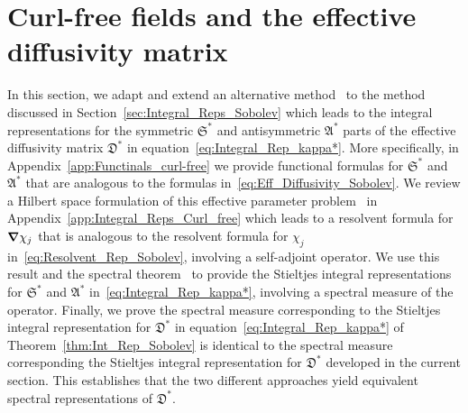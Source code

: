 \documentclass[english,12pt,jmp,graphicx]{revtex4-1}
\newcommand{\thmref}[1]{Theorem~\ref{#1}}
\newcommand{\secref}[1]{Section~\ref{#1}}
\newcommand{\appref}[1]{Appendix~\ref{#1}}
\newcommand{\bnabla}{\mbox{\boldmath${\nabla}$}}
\newcommand{\Sg}{\mathfrak{S}}
\newcommand{\Ag}{\mathfrak{A}}
\newcommand{\Dg}{\mathfrak{D}}
\begin{document}
\section{Curl-free fields and the effective diffusivity
  matrix} \label{app:Curl_Free}    
%
In this section, we adapt and extend an alternative
method~\cite{Avellaneda:PRL-753,Avellaneda:CMP-339} to the method
discussed in \secref{sec:Integral_Reps_Sobolev} which leads to the 
integral representations for the symmetric $\Sg^*$ and antisymmetric
$\Ag^*$ parts of the effective diffusivity matrix $\Dg^*$ in
equation~\eqref{eq:Integral_Rep_kappa*}. More 
specifically, in \appref{app:Functinals_curl-free} we 
provide functional formulas for $\Sg^*$ and $\Ag^*$ that are analogous 
to the formulas in~\eqref{eq:Eff_Diffusivity_Sobolev}. 
We review a Hilbert space formulation of this effective parameter 
problem~\cite{Avellaneda:CMP-339,Avellaneda:PRL-753,Fannjiang:1994:SIAM_JAM:333,Fannjiang:1997:1033,Majda:Kramer:1999:book} 
in \appref{app:Integral_Reps_Curl_free}
which leads to a resolvent formula for $\bnabla\chi_j$ that is analogous 
to the resolvent formula for $\chi_j$ in~\eqref{eq:Resolvent_Rep_Sobolev}, 
involving a self-adjoint
operator. We use this result and the spectral
theorem~\cite{Stone:64,Reed-1980} to provide the Stieltjes integral
representations for $\Sg^*$ and $\Ag^*$ in~\eqref{eq:Integral_Rep_kappa*}, 
involving a
spectral measure of the operator. Finally, 
we prove the spectral measure corresponding to the Stieltjes integral representation 
for $\Dg^*$ in equation~\eqref{eq:Integral_Rep_kappa*} of \thmref{thm:Int_Rep_Sobolev} 
is identical to the spectral measure corresponding the Stieltjes integral 
representation for $\Dg^*$ developed in the current section. This establishes that the 
two different approaches yield equivalent spectral representations of
$\Dg^*$.
\end{document}
